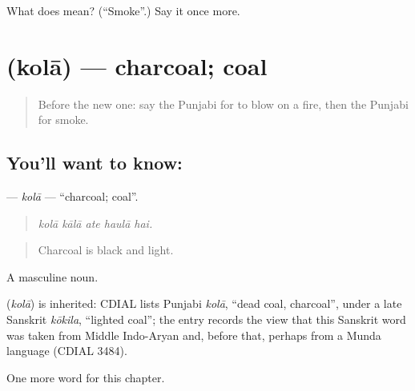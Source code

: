 \begin{tcolorbox}[breakable,colback=teal!4,colframe=teal!35!black,title={Before you move on}]
What does  mean? (\textquotedblleft{}Smoke\textquotedblright{}.) Say it once more.
\end{tcolorbox}
\section[\texorpdfstring{\pa{ਕੋਲਾ} (kolā)}{ਕੋਲਾ (kolā)}]{ (kolā) — charcoal; coal}

\label{lesson:PA-C249-kola}



\begin{quote}
Before the new one: say the Punjabi for to blow on a fire, then the Punjabi for smoke.
\end{quote}

\subsection*{You'll want to know: }
\textbf{} — \emph{kolā} — \textquotedblleft{}charcoal; coal\textquotedblright{}.

\begin{quote}
    
\end{quote}

\begin{quote}
\emph{kolā kālā ate haulā hai.}
\end{quote}

\begin{quote}
Charcoal is black and light.
\end{quote}

A masculine noun.

\begin{cousinweb}
\textbf{} (\emph{kolā}) is inherited: CDIAL lists Punjabi \emph{kolā}, \textquotedblleft{}dead coal, charcoal\textquotedblright{}, under a late Sanskrit \emph{kōkila}, \textquotedblleft{}lighted coal\textquotedblright{}; the entry records the view that this Sanskrit word was taken from Middle Indo-Aryan and, before that, perhaps from a Munda language (CDIAL 3484).
\end{cousinweb}

\begin{grammarlens}[title={What you've built}]
One more word for this chapter.
\end{grammarlens}

